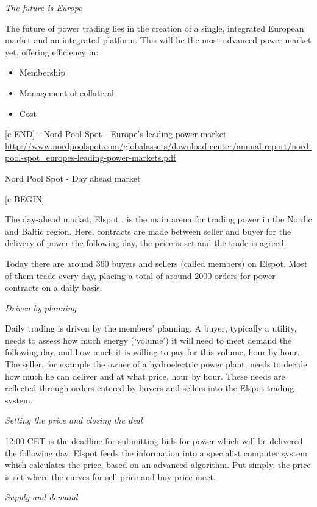 \emph{The future is Europe}

The future of power trading lies in the
creation of a single, integrated
European market and an integrated
platform.
This will be the most advanced power
market yet, offering efficiency in:

\begin{itemize}
\item Membership
\item Management of collateral
\item Cost
\end{itemize}

[c END] - Nord Pool Spot - Europe's leading power market \url{http://www.nordpoolspot.com/globalassets/download-center/annual-report/nord-pool-spot_europes-leading-power-markets.pdf}




Nord Pool Spot - Day ahead market

[c BEGIN]

The day-ahead market, Elspot , is the main arena for trading power in the Nordic and Baltic region. Here, contracts are made between seller and buyer for the delivery of power the following day, the price is set and the trade is agreed.

Today there are around 360 buyers and sellers (called members) on Elspot. Most of them trade every day, placing a total of around 2000 orders for power contracts on a daily basis.

\emph{Driven by planning}

Daily trading is driven by the members’ planning. A buyer, typically a utility, needs to assess how much energy (‘volume’) it will need to meet demand the following day, and how much it is willing to pay for this volume, hour by hour. The seller, for example the owner of a hydroelectric power plant, needs to decide how much he can deliver and at what price, hour by hour. These needs are reflected through orders entered by buyers and sellers into the Elspot trading system.

\emph{Setting the price and closing the deal}

12:00 CET is the deadline for submitting bids for power which will be delivered the following day. Elspot feeds the information into a specialist computer system which calculates the price, based on an advanced algorithm. Put simply, the price is set where the curves for sell price and buy price meet.

\emph{Supply and demand}

